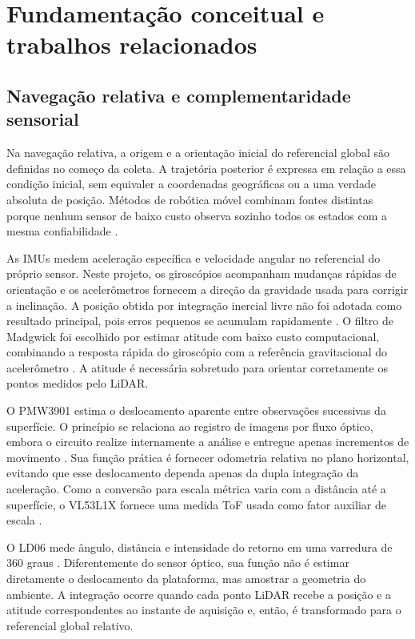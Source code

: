 \section{Fundamentação conceitual e trabalhos relacionados}
\label{sec:fundamentacao}

\subsection{Navegação relativa e complementaridade sensorial}

Na navegação relativa, a origem e a orientação inicial do referencial global são definidas no começo da coleta. A trajetória posterior é expressa em relação a essa condição inicial, sem equivaler a coordenadas geográficas ou a uma verdade absoluta de posição. Métodos de robótica móvel combinam fontes distintas porque nenhum sensor de baixo custo observa sozinho todos os estados com a mesma confiabilidade \parencite{thrun2005probabilistic,groves2013principles}.

As IMUs medem aceleração específica e velocidade angular no referencial do próprio sensor. Neste projeto, os giroscópios acompanham mudanças rápidas de orientação e os acelerômetros fornecem a direção da gravidade usada para corrigir a inclinação. A posição obtida por integração inercial livre não foi adotada como resultado principal, pois erros pequenos se acumulam rapidamente \parencite{tittertonWeston2004,farrell2008aided}. O filtro de Madgwick foi escolhido por estimar atitude com baixo custo computacional, combinando a resposta rápida do giroscópio com a referência gravitacional do acelerômetro \parencite{madgwick2010efficient}. A atitude é necessária sobretudo para orientar corretamente os pontos medidos pelo LiDAR.

O PMW3901 estima o deslocamento aparente entre observações sucessivas da superfície. O princípio se relaciona ao registro de imagens por fluxo óptico, embora o circuito realize internamente a análise e entregue apenas incrementos de movimento \parencite{lucasKanade1981,pixart2017pmw3901}. Sua função prática é fornecer odometria relativa no plano horizontal, evitando que esse deslocamento dependa apenas da dupla integração da aceleração. Como a conversão para escala métrica varia com a distância até a superfície, o VL53L1X fornece uma medida ToF usada como fator auxiliar de escala \parencite{stmicroelectronics2024vl53l1x}.

O LD06 mede ângulo, distância e intensidade do retorno em uma varredura de 360 graus \parencite{ldrobot2019ld06}. Diferentemente do sensor óptico, sua função não é estimar diretamente o deslocamento da plataforma, mas amostrar a geometria do ambiente. A integração ocorre quando cada ponto LiDAR recebe a posição e a atitude correspondentes ao instante de aquisição e, então, é transformado para o referencial global relativo.

